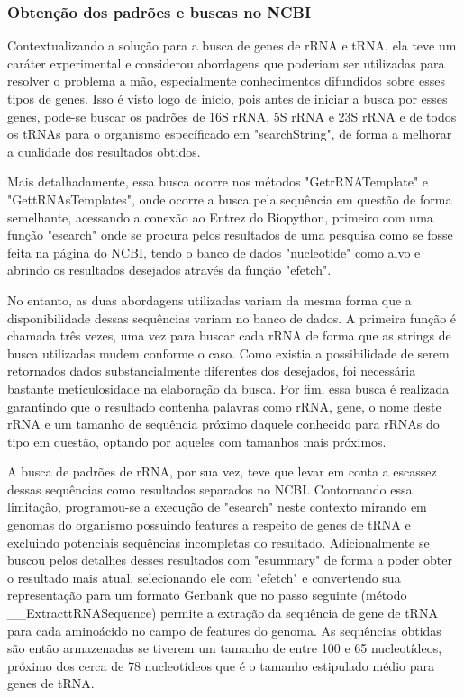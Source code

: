 \documentclass[brazilian,12pt,a4paper,final]{article}
\begin{document}
	\subsubsection{Obtenção dos padrões e buscas no NCBI}
	Contextualizando a solução para a busca de genes de rRNA e tRNA, ela teve um caráter experimental e considerou abordagens que poderiam ser utilizadas para resolver o problema a mão, especialmente conhecimentos difundidos sobre esses tipos de genes. Isso é visto logo de início, pois antes de iniciar a busca por esses genes, pode-se buscar os padrões de 16S rRNA, 5S rRNA e 23S rRNA e de todos os tRNAs para o organismo específicado em "searchString", de forma a melhorar a qualidade dos resultados obtidos. 
	
	\vspace{0.5cm}
	
	Mais detalhadamente, essa busca ocorre nos métodos "GetrRNATemplate" e "GettRNAsTemplates", onde ocorre a busca pela sequência em questão de forma  semelhante, acessando a conexão ao Entrez do Biopython, primeiro com uma função "esearch" onde se procura pelos resultados de uma pesquisa como se fosse feita na página do NCBI, tendo o banco de dados "nucleotide" como alvo e abrindo os resultados desejados através da função "efetch".
	
	\vspace{0.5cm}
	
	No entanto, as duas abordagens utilizadas variam da mesma forma que a disponibilidade dessas sequências variam no banco de dados. A primeira função é chamada três vezes, uma vez para buscar cada rRNA de forma que as strings de busca utilizadas mudem conforme o caso. Como existia a possibilidade de serem retornados dados substancialmente diferentes dos desejados, foi necessária bastante meticulosidade na elaboração da busca. Por fim, essa busca é realizada garantindo que o resultado contenha palavras como rRNA, gene, o nome deste rRNA e um tamanho de sequência próximo daquele conhecido para rRNAs do tipo em questão, optando por aqueles com tamanhos mais próximos.
	\\
	\vspace{0.5cm}
	
	A busca de padrões de rRNA, por sua vez, teve que levar em conta a escassez dessas sequências como resultados separados no NCBI. Contornando essa limitação, programou-se a execução de "esearch" neste contexto mirando em genomas do organismo possuindo features a respeito de genes de tRNA e excluindo potenciais sequências incompletas do resultado. Adicionalmente se buscou pelos detalhes desses resultados com "esummary" de forma a poder obter o resultado mais atual, selecionando ele com "efetch" e convertendo sua representação para um formato Genbank que no passo seguinte  (método \_\_ExtracttRNASequence) permite a extração da sequência de gene de tRNA para cada aminoácido no campo de features do genoma. As sequências obtidas são então armazenadas se tiverem um tamanho de entre 100 e 65 nucleotídeos, próximo dos cerca de 78 nucleotídeos que é o tamanho estipulado médio para genes de tRNA.
	
\end{document}
